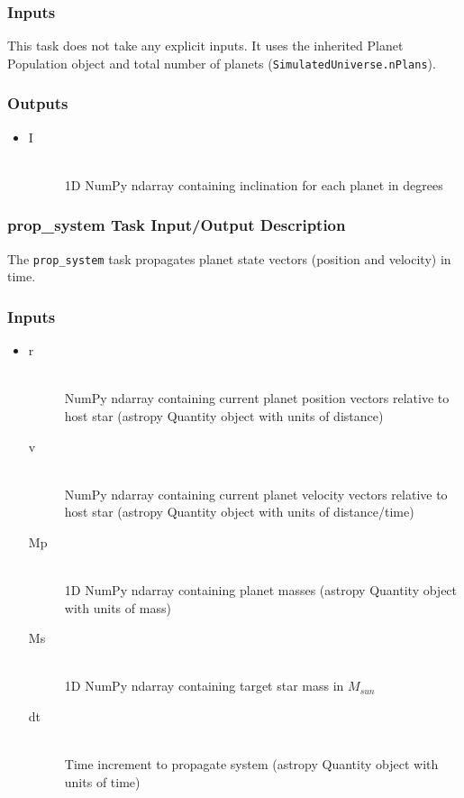 \documentclass[cleanfoot]{asme2ej}
\begin{document}
\subsubsection*{Inputs}
This task does not take any explicit inputs.  It uses the inherited Planet Population object and total number of planets (\verb+SimulatedUniverse.nPlans+).

\subsubsection*{Outputs}
\begin{itemize}
    \item 
    \begin{description}
        \item[I] \hfill \\
        1D NumPy ndarray containing inclination for each planet in degrees 
    \end{description}
\end{itemize}

\subsubsection{prop\_system Task Input/Output Description} \label{sec:propsystemtask}
The \verb+prop_system+ task propagates planet state vectors (position and velocity) in time.

\subsubsection*{Inputs}
\begin{itemize}
    \item 
    \begin{description}
        \item[r] \hfill \\
        NumPy ndarray containing current planet position vectors relative to host star (astropy Quantity object with units of distance)
        \item[v] \hfill \\
        NumPy ndarray containing current planet velocity vectors relative to host star (astropy Quantity object with units of distance/time)
        \item[Mp] \hfill \\
        1D NumPy ndarray containing planet masses (astropy Quantity object with units of mass)
        \item[Ms] \hfill \\
        1D NumPy ndarray containing target star mass in $ M_{sun} $
        \item[dt] \hfill \\
        Time increment to propagate system (astropy Quantity object with units of time)
    \end{description}
\end{itemize}
\end{document}
